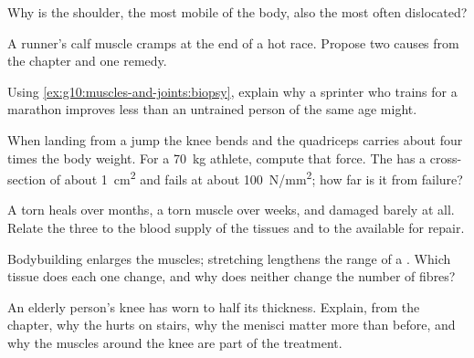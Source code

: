 \begin{exercise}[$\star\star$]\label{exo:g10:muscles-and-joints:9}
Why is the shoulder, the most mobile  of the body, also the most
often dislocated?
\end{exercise}

\begin{exercise}[$\star\star$]\label{exo:g10:muscles-and-joints:10}
A runner's calf muscle cramps at the end of a hot race. Propose two
causes from the chapter and one remedy.
\end{exercise}

\begin{exercise}[$\star\star$]\label{exo:g10:muscles-and-joints:11}
Using \cref{ex:g10:muscles-and-joints:biopsy}, explain why a sprinter
who trains for a marathon improves less than an untrained person of
the same age might.
\end{exercise}

\begin{exercise}[$\star\star\star$]\label{exo:g10:muscles-and-joints:12}
When landing from a jump the knee bends and the quadriceps 
carries about four times the body weight. For a \qty{70}{kg} athlete,
compute that force. The  has a cross-section of about
\qty{1}{cm^2} and fails at about \qty{100}{N/mm^2}; how far is it from
failure?
\end{exercise}

\begin{exercise}[$\star\star\star$]\label{exo:g10:muscles-and-joints:13}
A torn  heals over months, a torn muscle over weeks, and
damaged  barely at all. Relate the three to the blood supply
of the tissues and to the  available for repair.
\end{exercise}

\begin{exercise}[$\star\star\star$]\label{exo:g10:muscles-and-joints:14}
Bodybuilding enlarges the muscles; stretching lengthens the range of
a . Which tissue does each one change, and why does neither
change the number of fibres?
\end{exercise}

\begin{exercise}[$\star\star\star$]\label{exo:g10:muscles-and-joints:15}
An elderly person's knee  has worn to half its thickness.
Explain, from the chapter, why the  hurts on stairs, why the
menisci matter more than before, and why the muscles around the knee
are part of the treatment.
\end{exercise}

